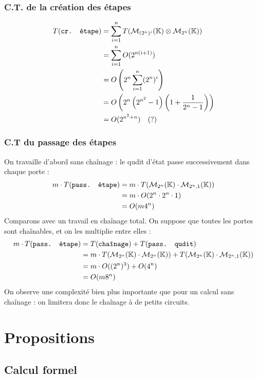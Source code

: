 \documentclass[french]{article}
\newcommand{\somme}{\displaystyle\sum}
\newcommand{\mat}[3]{\mathcal{M}_{#1,#2} (#3)}
\newcommand{\matc}[2]{\mathcal{M}_{#1} (#2)}
\newcommand{\corps}{\mathbb{K}}
\newcommand{\mc}[1]{\text{\texttt{#1}}}
\begin{document}
\subsubsection{C.T. de la création des étapes}

\begin{align*}
T(\mc{cr. étape})
&= \somme^{n}_{i=1} T(\matc{(2^n)^i}{\corps} \otimes \matc{2^n}{\corps}) \\
&= \somme^{n}_{i=1} O(2^{n(i+1)}) \\
&= O\left(2^n \somme^{n}_{i=1} (2^n)^i\right) \\
&= O\left(2^n\left(2^{n^2} - 1\right)\left(1 + \frac{1}{2^n - 1}\right)\right) \\
&= O(2^{n^2 + n}) \quad (?)
\end{align*}

\subsubsection{C.T du passage des étapes}


On travaille d'abord sans chaînage : le qudit d'état passe successivement dans chaque porte :
\begin{align*}
m \cdot T(\mc{pass. étape})
&= m \cdot T(\matc{2^n}{\corps} \cdot \mat{2^n}{1}{\corps}) \\
&= m \cdot O(2^n \cdot 2^n \cdot 1) \\
&= O(m 4^n)
\end{align*}
Comparons avec un travail en chaînage total. On suppose que toutes les portes sont chaînables, et on les multiplie entre elles :
\begin{align*}
m \cdot T(\mc{pass. étape})
&= T(\mc{chaînage}) + T(\mc{pass. qudit}) \\
&= m \cdot T(\matc{2^n}{\corps} \cdot \matc{2^n}{\corps}) + T(\matc{2^n}{\corps} \cdot \mat{2^n}{1}{\corps})\\
&= m \cdot O((2^n)^3) + O(4^n)\\
&= O(m 8^n)
\end{align*}
On observe une complexité bien plus importante que pour un calcul sans chaînage : on limitera donc le chaînage à de petits circuits.

\section{Propositions}

\subsection{Calcul formel}
\end{document}
